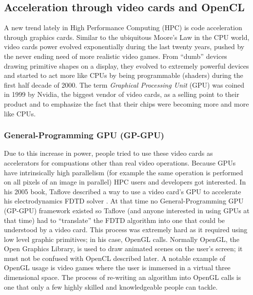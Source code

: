 \subsection{Acceleration through video cards and OpenCL}
\label{section:tools:opencl}

A new trend lately in High Performance Computing (HPC) is code acceleration
through graphics cards. Similar to the ubiquitous Moore's Law in the CPU world,
video cards power evolved exponentially during the last twenty years, pushed
by the never ending need of more realistic video games. From ``dumb'' devices
drawing primitive shapes on a display, they evolved to extremely powerful
devices and started to act more like CPUs by being programmable (shaders) during
the first half 
%
decade 
%
of 2000. The term \textit{Graphical Processing Unit} (GPU) was
coined in 1999 by Nvidia, the biggest vendor of video cards, as a selling point
to their product and to emphasize the fact that their chips were becoming more
and more %
like CPUs.


\subsubsection{General-Programming GPU (GP-GPU)}

Due to this increase in power, people tried to use these video cards as
accelerators for 
compuations other than real video operations. Because GPUs have
intrinsically high parallelism (for example the same operation is performed on
all pixels of an image in parallel) HPC users and developers got interested.
In his 2005 book, Taflove described a way to use a video card's GPU to
accelerate his electrodynamics FDTD solver \cite{Taflove2005}. At that time no
General-Programming GPU (GP-GPU) framework existed so Taflove (and anyone
interested in using GPUs at that time) had to ``translate'' the FDTD algorithm
into one that could be understood by a video card. This process was extremely
hard as it required using low level graphic primitives; in his case, OpenGL
calls.
Normally OpenGL, the Open Graphics Library,
is used to draw animated scenes on the user's screen; it must not be confused
with OpenCL described later.
A notable example of OpenGL usage is video games where the user is immersed in a
virtual three dimensional space. The process of re-writing an algorithm into
OpenGL calls is one that only a few highly skilled and knowledgeable people can
tackle.


